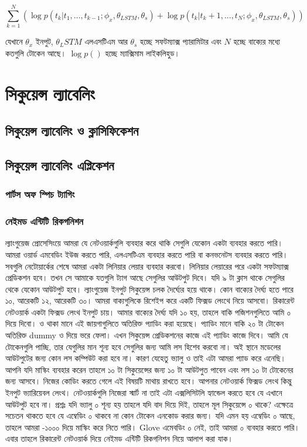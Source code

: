 \documentclass{book}
\begin{document}
\begin{equation}
\sum_{k=1}^{N} (\log p(t_k|t_1,...,t_{k-1}; \phi_x, \theta_{LSTM}, \theta_s) + \log p(t_k|t_k+1,...,t_{N}; \phi_x, \theta_{LSTM}, \theta_s) )
\end{equation}

যেখানে $\theta_x$ ইনপুট, $\theta_LSTM$ এলএসটিএম আর $\theta_s$ হচ্ছে সফটম্যাক্স প্যারামিটার এবং $N$ হচ্ছে বাক্যের মধ্যে কতগুলি টোকেন আছে। $\log p()$ হচ্ছে ম্যাক্সিমাম লাইকলিহুড। 


\chapter{সিকুয়েন্স ল্যাবেলিং }
\section{সিকুয়েন্স ল্যাবেলিং ও ক্লাসিফিকেশন}
\section{সিকুয়েন্স ল্যাবেলিং এপ্লিকেশন}
\subsection{পার্টস অফ স্পিচ ট্যাগিং}
\subsection{নেইমড এন্টিটি রিকগনিশন}
ল্যাংগুয়েজ প্রোসেসিংয়ে আমরা যে নেটওয়ার্কগুলি ব্যবহার করে থাকি সেগুলি যেকোন একটা ব্যবহার করতে পারি। আমরা ওয়ার্ড এমবেডিং ইউজ করতে পারি, এলএসটিএম ব্যবহার করতে পারি বা কনভনেটস ব্যবহার করতে পারি। সবগুলি নেটোয়ার্কের শেষে আমরা একটা লিনিয়ার লেয়ার ব্যবহার করবো। লিনিয়ার লেয়ারের পরে একটা সফটম্যাক্স প্রেডিকশন হবে। তখন সে আমাকে যতগুলি ট্যাগ আছে সেগুলির আউটপুট দিবে। যদি ৯ টা ক্লাস থাকে সেগুলির থেকে যেকোন আউটপুট হবে। ল্যাংগুয়েজ ইনপুট সিকুয়েন্স চলক দৈর্ঘ্যের হয়ে থাকে। কোন বাক্যের দৈর্ঘ্য হতে পারে ১০, আরেকটি ১২, আরেকটি ৩০। আমরা বাক্যগুলিকে রিশেইপ করে একটি ফিক্সড লেংথে নিয়ে আসবো। রিকারেন্ট নেটওয়ার্ক একটা ফিক্সড লেংথ ইনপুট চায়। আমার বাক্যের দৈর্ঘ্য যদি ১০ হয়, তাহলে বাকি পজিশনগুলিতে আমি ০ দিয়ে দিবো। ও থাকা মানে এই জায়গাগুলিতে অতিরিক্ত প্যাডিং করা হয়েছে। প্যাডিং মানে বাকি ২০ টা টোকেন অতিরিক্ত dummy ও দিয়ে ভরে ফেলা। এখন সিকুয়েন্স প্রেডিকশনের কাজে এই প্যাডিং কাজে দিবে। আমি যে টোকেনগুলি পাচ্ছি, তার যেগুলির মান শূন্য হবে সেগুলির জন্য আমি লস হিশেব করবো না। অই স্থানে মডেলের আউটপুটের জন্য কোন লস কম্পিউট করা হবে না। কারণ যেহেতু ভ্যালু ও তাই এটা আমরা প্যাড করে এনেছি। আপনি যদি মাস্কিং ব্যবহার করেন তাহলে ১০ টা সিকুয়েন্সের জন্য ১০ টা আউটপুত পাবেন এবং লস ১০ টা টোকেনের জন্য আসবে। নিজের কোডিং করতে গেলে এই বিষয়টি মাথায় রাখতে হবে। আপনার নেটওয়ার্ক ফিক্সড লেংথ কিন্তু ইনপুট ভ্যারিয়েবল লেংথ। নেটওয়ার্কগুলি নিজেরা স্মার্ট না তাই এটা এক্সলিসিটলি হ্যান্ডেল করতে হবে যে এখানে আউটপুট হবে না। প্রশ্নঃ যদি ভ্যালু ০ শূন্য হয় তাহলে যদি বাদ দিয়ে দিই, তাহলে মূল সিকুয়েন্সে ০ থাকে? এক্ষেত্রে সচেতন থাকতে হবে যে এম্বেডিং ০ থাকবে না কোন টোকেন এনকোড করার জন্য। যদি এমন হয় এম্বেডিং ০ আছে, তাহলে আমরা -১০০০ দিয়ে মাস্কিং করে নিতে পারি। Glove এমেবডিং ০ নেই, তাই আমরা ০ ব্যবহার করতে পারি। এবার তাহলে রিকারেন্ট নেটওয়ার্ক দিয়ে নেইমড এন্টিটি রিকগনিশন নিয়ে আলাপ করা যাক। 
\end{document}
